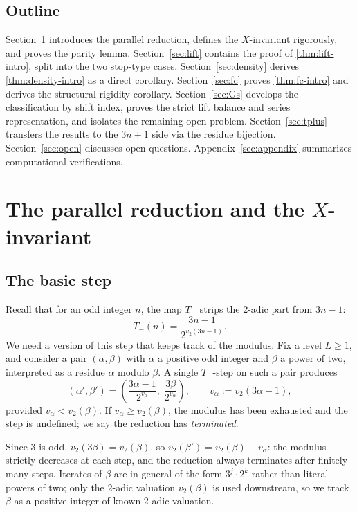 \documentclass[11pt,reqno]{amsart}
\newcommand{\Tminus}{T_{-}}
\newcommand{\vtwo}{v_{2}}
\begin{document}
\subsection{Outline}

Section~\ref{sec:setup} introduces the parallel reduction, defines the
$X$-invariant rigorously, and proves the parity lemma. Section~\ref{sec:lift}
contains the proof of \cref{thm:lift-intro}, split into the two
stop-type cases. Section~\ref{sec:density} derives
\cref{thm:density-intro} as a direct corollary. Section~\ref{sec:fc}
proves \cref{thm:fc-intro} and derives the structural rigidity
corollary. Section~\ref{sec:Gs} develops the classification by shift index,
proves the strict lift balance and series representation, and isolates the
remaining open problem. Section~\ref{sec:tplus} transfers the results to the
$3n+1$ side via the residue bijection. Section~\ref{sec:open} discusses open
questions. Appendix~\ref{sec:appendix} summarizes computational
verifications.

\section{The parallel reduction and the \texorpdfstring{$X$}{X}-invariant}
\label{sec:setup}

\subsection{The basic step}

Recall that for an odd integer $n$, the map $\Tminus$ strips the $2$-adic
part from $3n - 1$:
\[
\Tminus(n) = \frac{3n - 1}{2^{\vtwo(3n - 1)}}.
\]
We need a version of this step that keeps track of the modulus. Fix a level
$L \ge 1$, and consider a pair $(\alpha, \beta)$ with $\alpha$ a positive odd
integer and $\beta$ a power of two, interpreted as a residue $\alpha$ modulo
$\beta$. A single $\Tminus$-step on such a pair produces
\[
(\alpha', \beta') = \left(\frac{3\alpha - 1}{2^{v_\alpha}},\; \frac{3\beta}{2^{v_\alpha}}\right), \qquad v_\alpha := \vtwo(3\alpha - 1),
\]
provided $v_\alpha < \vtwo(\beta)$. If $v_\alpha \ge \vtwo(\beta)$, the
modulus has been exhausted and the step is undefined; we say the reduction
has \emph{terminated}.

Since $3$ is odd, $\vtwo(3\beta) = \vtwo(\beta)$, so
$\vtwo(\beta') = \vtwo(\beta) - v_\alpha$: the modulus strictly decreases at
each step, and the reduction always terminates after finitely many steps.
Iterates of $\beta$ are in general of the form $3^j \cdot 2^k$ rather
than literal powers of two; only the $2$-adic valuation $\vtwo(\beta)$ is
used downstream, so we track $\beta$ as a positive integer of known
$2$-adic valuation.
\end{document}
